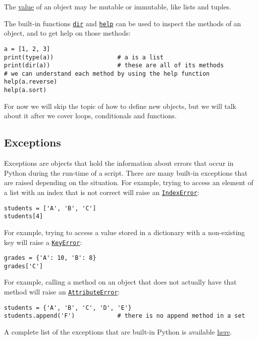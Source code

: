 \documentclass[12pt, a4paper]{article}
\begin{document}
The \uline{value} of an object may be mutable or immutable, like lists and tuples.

The built-in functions \href{https://docs.python.org/3.6/library/functions.html?\#dir}{\texttt{dir}} and \href{https://docs.python.org/3.6/library/functions.html?\#help}{\texttt{help}} can be used to inspect the methods of an object, and to get help on those methods:
\lstset{language=jupyter-python,label= ,caption= ,captionpos=b,numbers=none}
\begin{lstlisting}
a = [1, 2, 3]
print(type(a))                  # a is a list
print(dir(a))                   # these are all of its methods
# we can understand each method by using the help function
help(a.reverse)
help(a.sort)
\end{lstlisting}
For now we will skip the topic of how to define new objects, but we will talk about it after we cover loops, conditionals and functions.

\subsection{Exceptions}
\label{sec:org2c02f05}
Exceptions are objects that hold the information about errors that occur in Python during the run-time of a script.
There are many built-in exceptions that are raised depending on the situation.
For example, trying to access an element of a list with an index that is not correct will raise an \href{https://docs.python.org/3.6/library/exceptions.html?highlight=indexerror\#IndexError}{\texttt{IndexError}}:
\lstset{language=jupyter-python,label= ,caption= ,captionpos=b,numbers=none}
\begin{lstlisting}
students = ['A', 'B', 'C']
students[4]
\end{lstlisting}

For example, trying to access a value stored in a dictionary with a non-existing key will raise a \href{https://docs.python.org/3.6/library/exceptions.html?\#KeyError}{\texttt{KeyError}}:
\lstset{language=jupyter-python,label= ,caption= ,captionpos=b,numbers=none}
\begin{lstlisting}
grades = {'A': 10, 'B': 8}
grades['C']
\end{lstlisting}

For example, calling a method on an object that does not actually have that method will raise an \href{https://docs.python.org/3.6/library/exceptions.html?\#AttributeError}{\texttt{AttributeError}}:
\lstset{language=jupyter-python,label= ,caption= ,captionpos=b,numbers=none}
\begin{lstlisting}
students = {'A', 'B', 'C', 'D', 'E'}
students.append('F')            # there is no append method in a set
\end{lstlisting}
A complete list of the exceptions that are built-in Python is available \href{https://docs.python.org/3.6/library/exceptions.html\#concrete-exceptions}{here}.
\end{document}

